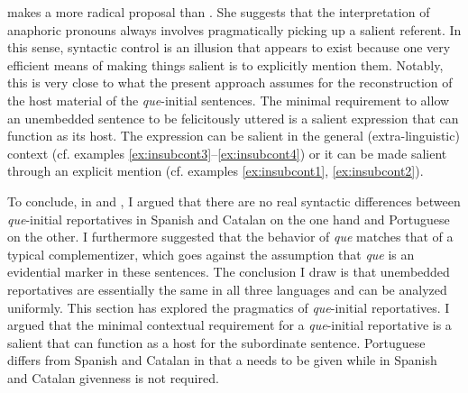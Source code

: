 \citet{Jacobson2012} makes a  more radical proposal than \citet{Hankamer1976}. She suggests  that the interpretation of anaphoric pronouns always  involves  pragmatically picking up a salient referent. In this sense, syntactic control is an illusion that appears to exist because  one very efficient means of making  things salient is to explicitly mention them. Notably, this is very close to what the present approach assumes for the reconstruction of the host material of the \emph{que}-initial sentences. The minimal requirement to allow an unembedded sentence to be felicitously uttered is a salient  expression that can function as its host. The  expression can be salient in the general (extra-linguistic) context (cf. examples \ref{ex:insubcont3}--\ref{ex:insubcont4}) or it can be made salient  through an explicit mention (cf. examples \ref{ex:insubcont1}, \ref{ex:insubcont2}). 





To conclude, in   and , I argued that there are no real syntactic differences between \emph{que}-initial reportatives in Spanish and Catalan on the one hand and Portuguese on the other. I furthermore suggested that the behavior of \emph{que} matches that of a typical complementizer, which goes against the assumption that  \emph{que} is an evidential marker in these sentences. The conclusion I draw is that unembedded reportatives are essentially the same in all three languages and can be analyzed  uniformly. This section  has explored  the pragmatics of \emph{que}-initial reportatives. I argued that the minimal contextual requirement for a \emph{que}-initial reportative is a salient \emph{} that can function as a host for the subordinate sentence.  Portuguese differs from Spanish and Catalan in that a \emph{} needs to be given while in Spanish and Catalan givenness is not required.  

